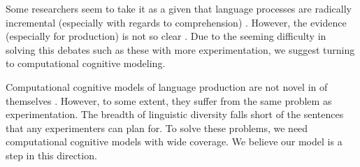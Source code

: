 Some researchers seem to take it as a given that language processes are radically incremental (especially with regards to comprehension) \citep{tag1}\citep{radical}. However, the evidence (especially for production) is not so clear \citep{incremental}. Due to the seeming difficulty in solving this debates such as these with more experimentation, we suggest turning to computational cognitive modeling.
 
Computational cognitive models of language production are not novel in of themselves \citep{model}. However, to some extent, they suffer from the same problem as experimentation. The breadth of linguistic diversity falls short of the sentences that any experimenters can plan for. To solve these problems, we need computational cognitive models with wide coverage. We believe our model is a step in this direction.